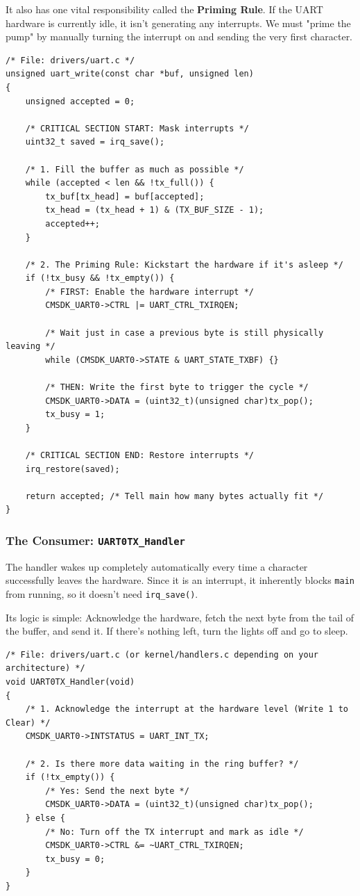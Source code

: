It also has one vital responsibility called the \textbf{Priming Rule}. If the UART hardware is currently idle, it isn't generating any interrupts. We must "prime the pump" by manually turning the interrupt on and sending the very first character. 

\begin{lstlisting}
/* File: drivers/uart.c */
unsigned uart_write(const char *buf, unsigned len)
{
    unsigned accepted = 0;
    
    /* CRITICAL SECTION START: Mask interrupts */
    uint32_t saved = irq_save(); 

    /* 1. Fill the buffer as much as possible */
    while (accepted < len && !tx_full()) {
        tx_buf[tx_head] = buf[accepted];
        tx_head = (tx_head + 1) & (TX_BUF_SIZE - 1);
        accepted++;
    }

    /* 2. The Priming Rule: Kickstart the hardware if it's asleep */
    if (!tx_busy && !tx_empty()) {
        /* FIRST: Enable the hardware interrupt */
        CMSDK_UART0->CTRL |= UART_CTRL_TXIRQEN; 
        
        /* Wait just in case a previous byte is still physically leaving */
        while (CMSDK_UART0->STATE & UART_STATE_TXBF) {} 
        
        /* THEN: Write the first byte to trigger the cycle */
        CMSDK_UART0->DATA = (uint32_t)(unsigned char)tx_pop(); 
        tx_busy = 1;
    }

    /* CRITICAL SECTION END: Restore interrupts */
    irq_restore(saved); 
    
    return accepted; /* Tell main how many bytes actually fit */
}
\end{lstlisting}

\subsubsection{The Consumer: \texttt{UART0TX\_Handler}}
The handler wakes up completely automatically every time a character successfully leaves the hardware. Since it is an interrupt, it inherently blocks \texttt{main} from running, so it doesn't need \texttt{irq\_save()}.

Its logic is simple: Acknowledge the hardware, fetch the next byte from the tail of the buffer, and send it. If there's nothing left, turn the lights off and go to sleep.

\begin{lstlisting}
/* File: drivers/uart.c (or kernel/handlers.c depending on your architecture) */
void UART0TX_Handler(void)
{
    /* 1. Acknowledge the interrupt at the hardware level (Write 1 to Clear) */
    CMSDK_UART0->INTSTATUS = UART_INT_TX; 

    /* 2. Is there more data waiting in the ring buffer? */
    if (!tx_empty()) {
        /* Yes: Send the next byte */
        CMSDK_UART0->DATA = (uint32_t)(unsigned char)tx_pop(); 
    } else {
        /* No: Turn off the TX interrupt and mark as idle */
        CMSDK_UART0->CTRL &= ~UART_CTRL_TXIRQEN;  
        tx_busy = 0;                              
    }
}
\end{lstlisting}

